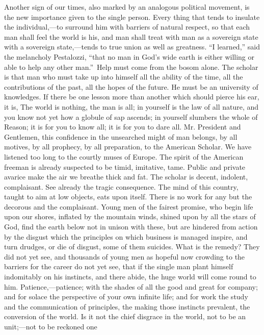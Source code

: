 Another sign of our times, also marked by an analogous political
movement, is the new importance given to the single person. Every
thing that tends to insulate the individual,---to surround him with
barriers of natural respect, so that each man shall feel the world is
his, and man shall treat with man as a sovereign state with a
sovereign state,---tends to true union as well as greatness. ``I
learned,'' said the melancholy Pestalozzi, ``that no man in God's wide
earth is either willing or able to help any other man.'' Help must
come from the bosom alone. The scholar is that man who must take up
into himself all the ability of the time, all the contributions of the
past, all the hopes of the future. He must be an university of
knowledges. If there be one lesson more than another which 
should pierce his ear, it is, The world is nothing, the man is all; in
yourself is the law of all nature, and you know not yet how a globule
of sap ascends; in yourself slumbers the whole of Reason; it is for
you to know all; it is for you to dare all. Mr. President and
Gentlemen, this confidence in the unsearched might of man belongs, by
all motives, by all prophecy, by all preparation, to the American
Scholar. We have listened too long to the courtly muses of Europe. The
spirit of the American freeman is already suspected to be timid,
imitative, tame. Public and private avarice make the air we breathe
thick and fat. The scholar is decent, indolent, complaisant. See
already the tragic consequence. The mind of this country, taught to
aim at low objects, eats upon itself. There is no work for any but the
decorous and the complaisant. Young men of the fairest promise, who
begin life upon our shores, inflated by the mountain winds, shined
upon by all the stars of God, find the earth below not in unison with
these, but are hindered from action by the disgust which the
principles on which business is managed inspire, and turn drudges,
or die of disgust, some of them suicides. What is the remedy? They did
not yet see, and thousands of young men as hopeful  now
crowding to the barriers for the career do not yet see, that if the
single man plant himself indomitably on his instincts, and there
abide, the huge world will come round to him. Patience,---pa\-tience;
with the shades of all the good and great for company; and for solace
the perspective of your own infinite life; and for work the study
and the communication of principles, the making those instincts
prevalent, the conversion of the world. Is it not the chief disgrace
in the world, not to be an u\-nit;---not to be reckoned one
